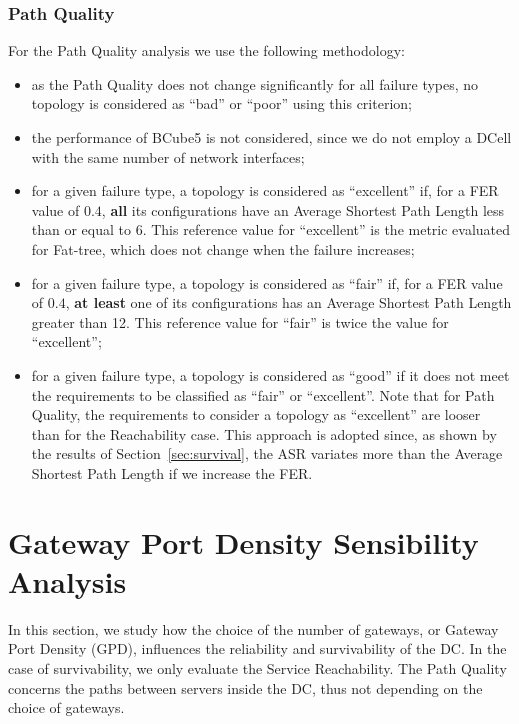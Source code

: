 \subsubsection{Path Quality}

For the Path Quality analysis we use the following methodology:

\begin{itemize}
\item as the Path Quality does not change significantly for all failure types, no topology is considered as ``bad'' or ``poor'' using this criterion;
\item the performance of BCube5 is not considered, since we do not employ a DCell with the same number of network interfaces;
\item for a given failure type, a topology is considered as ``excellent'' if, for a FER value of $0.4$, \textbf{all} its configurations have an Average Shortest Path Length less than or equal to 6. 
This reference value for ``excellent'' is the metric evaluated for Fat-tree, which does not change when the failure increases;
\item for a given failure type, a topology is considered as ``fair'' if, for a FER value of $0.4$, \textbf{at least} one of its configurations has an Average Shortest Path Length greater than 12. This reference value for ``fair'' is twice the value for ``excellent'';
\item for a given failure type, a topology is considered as ``good'' if it does not meet the requirements to be classified as ``fair'' or ``excellent''. Note that for Path Quality, the requirements to consider a topology as ``excellent'' are looser than for the Reachability case. This approach is adopted since, as shown by the results of Section~\ref{sec:survival}, the ASR variates more than the Average Shortest Path Length if we increase the FER.
\end{itemize}

\section{Gateway Port Density Sensibility Analysis} 
\label{sec:edpAnalysis}

In this section, we study how the choice of the number of gateways, or Gateway Port Density (GPD), influences the reliability and survivability of the DC.
In the case of survivability, we only evaluate the Service Reachability. The Path Quality concerns the paths between servers inside the DC, thus not depending on the choice of gateways. 

